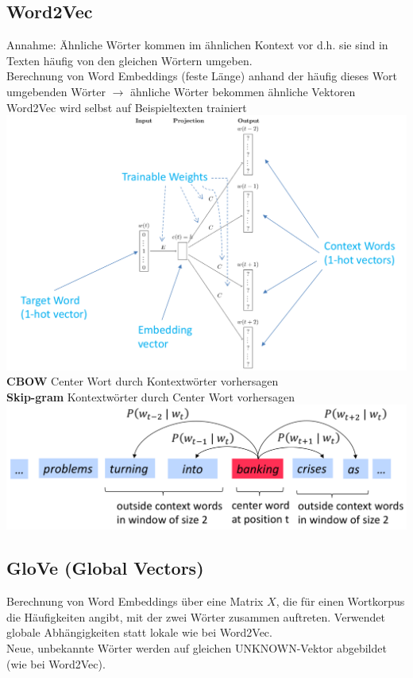 \documentclass[12pt]{article}
\begin{document}
	\subsection{Word2Vec}
	Annahme: Ähnliche Wörter kommen im ähnlichen Kontext vor d.h. sie sind in Texten häufig von den gleichen Wörtern umgeben.\\
	Berechnung von Word Embeddings (feste Länge) anhand der häufig dieses Wort umgebenden Wörter $\rightarrow$ ähnliche Wörter bekommen ähnliche Vektoren\\
	Word2Vec wird selbst auf Beispieltexten trainiert\\
	\includegraphics[width=\linewidth]{figures/word2vec-nn.png}\\
	\textbf{CBOW} Center Wort durch Kontextwörter vorhersagen\\
	\textbf{Skip-gram} Kontextwörter durch Center Wort vorhersagen\\
	\includegraphics[width=\linewidth]{figures/word2vec.png}

	\subsection{GloVe (Global Vectors)}
	Berechnung von Word Embeddings über eine Matrix $X$, die für einen Wortkorpus die Häufigkeiten angibt, mit der zwei Wörter zusammen auftreten. Verwendet globale Abhängigkeiten statt lokale wie bei Word2Vec.\\
	Neue, unbekannte Wörter werden auf gleichen UNKNOWN-Vektor abgebildet (wie bei Word2Vec).
\end{document}

